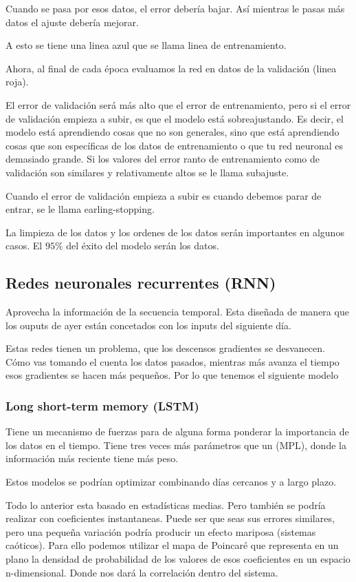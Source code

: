 Cuando se pasa por esos datos, el error debería bajar. Así mientras le pasas más datos el ajuste debería mejorar.

A esto se tiene una linea azul que se llama linea de entrenamiento. 

Ahora, al final de cada época evaluamos la red en datos de la validación (linea roja). 

El error de validación será más alto que el error de entrenamiento, pero si el error de validación empieza a subir, es que el modelo está sobreajustando. Es decir, el modelo está aprendiendo cosas que no son generales, sino que está aprendiendo cosas que son específicas de los datos de entrenamiento o que tu red neuronal es demasiado grande. Si los valores del error ranto de entrenamiento como de validación son similares y relativamente altos se le llama subajuste.

Cuando el error de validación empieza a subir es cuando debemos parar de entrar, se le llama earling-stopping.

La limpieza de los datos y los ordenes de los datos serán importantes en algunos casos. El $95\%$ del éxito del modelo serán los datos.

\subsection{Redes neuronales recurrentes (RNN)}
Aprovecha la información de la secuencia temporal. Esta diseñada de manera que los ouputs de ayer están concetados con los inputs del siguiente día.

Estas redes tienen un problema, que los descensos gradientes se desvanecen. Cómo vas tomando el cuenta los datos pasados, mientras más avanza el tiempo esos gradientes se hacen más pequeños. Por lo que tenemos el siguiente modelo

\subsubsection{Long short-term memory (LSTM)}
Tiene un mecanismo de fuerzas para de alguna forma ponderar la importancia de los datos en el tiempo. Tiene tres veces más parámetros que un (MPL), donde la información más reciente tiene más peso.

Estos modelos se podrían optimizar combinando días cercanos y a largo plazo.

Todo lo anterior esta basado en estadísticas medias. Pero también se podría realizar con coeficientes instantaneas. Puede ser que seas sus errores similares, pero una pequeña variación podría producir un efecto mariposa (sistemas caóticos). Para ello podemos utilizar el mapa de Poincaré que representa en un plano la densidad de probabilidad de los valores de esos coeficientes en un espacio n-dimensional. Donde nos dará la correlación dentro del sistema.

